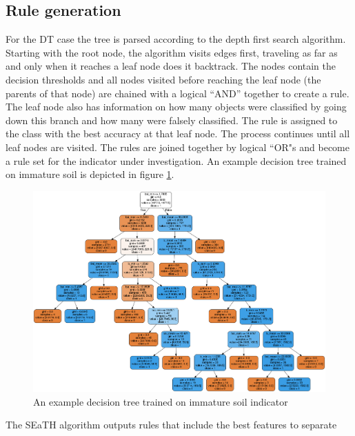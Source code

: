 \documentclass[authoryear, review,12pt,number]{elsarticle}
\begin{document}
\subsection{Rule generation}
For the DT case the tree is parsed according to the depth first search
algorithm. Starting with the root node, the algorithm visits edges first, 
traveling as far as and only when it reaches a leaf node does it backtrack. The 
nodes contain the decision thresholds and all nodes visited before reaching the 
leaf node (the parents of that node) are chained with a logical ``AND'' together to
create a rule. The leaf node also has information on how many objects were classified by 
going down this branch and how many were falsely classified. The rule is 
assigned to the class with the best accuracy at that leaf node. The process 
continues until all leaf nodes are visited. The rules are joined 
together by logical ``OR"s and become a rule set for the indicator under 
investigation. An example decision tree trained on immature soil is depicted in
figure \ref{fig:decisiontree}.
\begin{figure}
    \label{fig:decisiontree}
\includegraphics[width=\textwidth]{diagrams/natfo_immature_soil_dt.png}
    \caption{An example decision tree trained on immature soil indicator}
\end{figure}
The SEaTH algorithm outputs rules that include the best features to separate 
\end{document}
